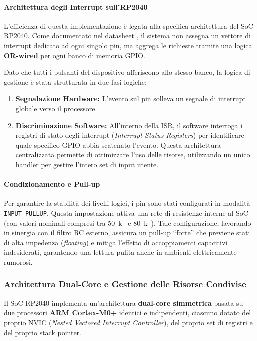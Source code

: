 \paragraph{Architettura degli Interrupt sull'RP2040}
L'efficienza di questa implementazione è legata alla specifica architettura del SoC RP2040. Come documentato nel datasheet \cite[\href{https://datasheets.raspberrypi.com/rp2040/rp2040-datasheet.pdf\#page=240}{Sez. 2.19.3}]{rp2040_ds}, il sistema non assegna un vettore di interrupt dedicato ad ogni singolo pin, ma aggrega le richieste tramite una logica \textbf{OR-wired} per ogni banco di memoria GPIO. 

Dato che tutti i pulsanti del dispositivo afferiscono allo stesso banco, la logica di gestione è stata strutturata in due fasi logiche:
\begin{enumerate}
    \item \textbf{Segnalazione Hardware:} L'evento sul pin solleva un segnale di interrupt globale verso il processore.
    \item \textbf{Discriminazione Software:} All'interno della ISR, il software interroga i registri di stato degli interrupt (\textit{Interrupt Status Registers}) per identificare quale specifico GPIO abbia scatenato l'evento. Questa architettura centralizzata permette di ottimizzare l'uso delle risorse, utilizzando un unico handler per gestire l'intero set di input utente.
\end{enumerate}

\paragraph{Condizionamento e Pull-up}
Per garantire la stabilità dei livelli logici, i pin sono stati configurati in modalità \texttt{INPUT\_PULLUP}. Questa impostazione attiva una rete di resistenze interne al SoC (con valori nominali compresi tra \qty{50}{k\Omega} e \qty{80}{k\Omega}). Tale configurazione, lavorando in sinergia con il filtro RC esterno, assicura un pull-up ``forte'' che previene stati di alta impedenza (\textit{floating}) e mitiga l'effetto di accoppiamenti capacitivi indesiderati, garantendo una lettura pulita anche in ambienti elettricamente rumorosi.




\subsubsection*{Architettura Dual-Core e Gestione delle Risorse Condivise}
\label{IPC}
Il SoC RP2040 implementa un'architettura \textbf{dual-core simmetrica} basata su due processori \textbf{ARM Cortex-M0+} identici e indipendenti, ciascuno dotato del proprio NVIC (\textit{Nested Vectored Interrupt Controller}), del proprio set di registri e del proprio stack pointer. 

